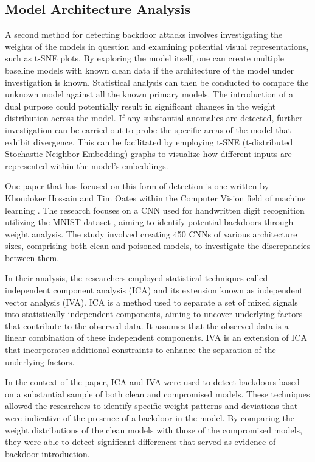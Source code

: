 \subsection{Model Architecture Analysis}

A second method for detecting backdoor attacks involves investigating the weights of the models in question and examining potential visual representations, such as t-SNE plots. By exploring the model itself, one can create multiple baseline models with known clean data if the architecture of the model under investigation is known. Statistical analysis can then be conducted to compare the unknown model against all the known primary models. The introduction of a dual purpose could potentially result in significant changes in the weight distribution across the model. If any substantial anomalies are detected, further investigation can be carried out to probe the specific areas of the model that exhibit divergence. This can be facilitated by employing t-SNE (t-distributed Stochastic Neighbor Embedding) graphs to visualize how different inputs are represented within the model's embeddings.

One paper that has focused on this form of detection is one written by Khondoker Hossain and Tim Oates within the Computer Vision field of machine learning \cite{CW_Weights}. The research focuses on a CNN used for handwritten digit recognition utilizing the MNIST dataset \cite{mnist_paper}, aiming to identify potential backdoors through weight analysis. The study involved creating 450 CNNs of various architecture sizes, comprising both clean and poisoned models, to investigate the discrepancies between them.

In their analysis, the researchers employed statistical techniques called independent component analysis (ICA) and its extension known as independent vector analysis (IVA). ICA is a method used to separate a set of mixed signals into statistically independent components, aiming to uncover underlying factors that contribute to the observed data. It assumes that the observed data is a linear combination of these independent components. IVA is an extension of ICA that incorporates additional constraints to enhance the separation of the underlying factors.

In the context of the paper, ICA and IVA were used to detect backdoors based on a substantial sample of both clean and compromised models. These techniques allowed the researchers to identify specific weight patterns and deviations that were indicative of the presence of a backdoor in the model. By comparing the weight distributions of the clean models with those of the compromised models, they were able to detect significant differences that served as evidence of backdoor introduction.

